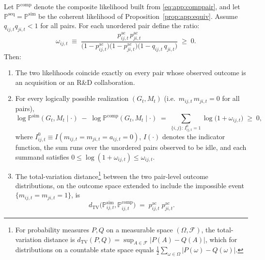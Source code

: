 \begin{proposition}%
\label{prop:app:composite}
Let $\mathbb{P}^{\mathrm{comp}}$ denote the composite likelihood built
from \eqref{eq:app:comppair}, and let $\mathbb{P}^{\mathrm{seq}} =
\mathbb{P}^{\mathrm{sim}}$ be the coherent likelihood of
Proposition~\ref{prop:app:equiv}. Assume $q_{ij,t} q_{ji,t} < 1$ for
all pairs. For each unordered pair define the ratio:
\begin{equation}
  \omega_{ij,t}
  \;\equiv\;
  \frac{p^{\mathrm{ac}}_{ij,t}\, p^{\mathrm{ac}}_{ji,t}}
       {\bigl( 1 - p^{\mathrm{ac}}_{ij,t} \bigr)
        \bigl( 1 - p^{\mathrm{ac}}_{ji,t} \bigr)
        \bigl( 1 - q_{ij,t}\, q_{ji,t} \bigr)}
  \;\ge\; 0 .
  \label{eq:app:omega}
\end{equation}
Then:
\begin{enumerate}
\item[(i)] The two likelihoods coincide exactly on every pair whose
observed outcome is an acquisition or an R\&D collaboration.
\item[(ii)] For every logically possible realization $(G_t, M_t)$
(i.e.\ $m_{ij,t}\, m_{ji,t} = 0$ for all pairs),
\begin{equation}
  \log \mathbb{P}^{\mathrm{sim}}(G_t, M_t \mid \cdot)
  \;-\;
  \log \mathbb{P}^{\mathrm{comp}}(G_t, M_t \mid \cdot)
  \;=\;
  \sum_{\{i,j\} :\, I_{ij,t}^{0} = 1}
  \log \bigl( 1 + \omega_{ij,t} \bigr)
  \;\ge\; 0,
  \label{eq:app:logratio}
\end{equation}
where $I_{ij,t}^{0} \equiv I(m_{ij,t} = m_{ji,t} = a_{ij,t} = 0)$, $I(\cdot)$ denotes the indicator function, the sum runs over the unordered pairs observed to be idle, and
each summand satisfies $0 \le \log(1+\omega_{ij,t}) \le \omega_{ij,t}$.
\item[(iii)] The total-variation distance\footnote{For probability measures $P,Q$ on a measurable space
$(\Omega,\mathcal{F})$, the total-variation distance is
$d_{\mathrm{TV}}(P,Q)=\sup_{A\in\mathcal{F}}|P(A)-Q(A)|$, which for
distributions on a countable state space equals
$\tfrac{1}{2}\sum_{\omega \in \Omega}|P(\omega)-Q(\omega)|$.} between the two pair-level
outcome distributions, on the outcome space extended to include the
impossible event $\{m_{ij,t}=m_{ji,t}=1\}$, is
\begin{equation}
  d_{\mathrm{TV}}
  \bigl( \mathbb{P}^{\mathrm{sim}}_{ij,t},
  \mathbb{P}^{\mathrm{comp}}_{ij,t} \bigr)
  \;=\;
  p^{\mathrm{ac}}_{ij,t}\; p^{\mathrm{ac}}_{ji,t}.
  \label{eq:app:tv}
\end{equation}
\end{enumerate}
\end{proposition}
